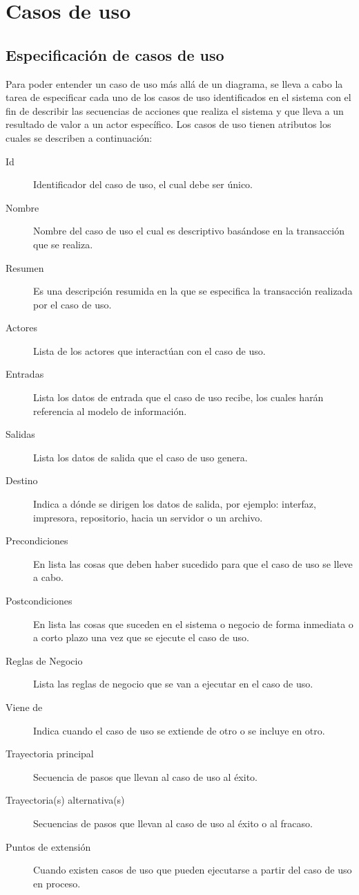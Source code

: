 \chapter{Casos de uso}


\section{Especificación de casos de uso}

Para poder entender un caso de uso más allá de un diagrama, se lleva a cabo la tarea de especificar cada uno de los casos de uso identificados en el sistema con el fin de describir las secuencias de acciones que realiza el sistema y que lleva a un resultado de valor a un actor específico. Los casos de uso tienen atributos los cuales se describen a continuación:

\begin{description}
	\item[Id] Identificador del caso de uso, el cual debe ser único.
	\item[Nombre] Nombre del caso de uso el cual es descriptivo basándose en la transacción que se realiza.
	\item[Resumen] Es una descripción resumida en la que se especifica la transacción realizada por el caso de uso.
	\item[Actores] Lista de los actores que interactúan con el caso de uso.
	\item[Entradas] Lista los datos de entrada que el caso de uso recibe, los cuales harán referencia al modelo de información.
	\item[Salidas] Lista los datos de salida que el caso de uso genera.
	\item[Destino] Indica a dónde se dirigen los datos de salida, por ejemplo: interfaz, impresora, repositorio, hacia un servidor o un archivo.
	\item[Precondiciones] En lista las cosas que deben haber sucedido para que el caso  de uso se lleve a cabo.
	\item[Postcondiciones] En lista las cosas que suceden en el sistema o negocio de forma inmediata o a corto plazo una vez que se ejecute el caso de uso.
	\item[Reglas de Negocio] Lista las reglas de negocio que se van a ejecutar en el caso de uso.
	\item[Viene de] Indica cuando el caso de uso se extiende de otro o se incluye en otro.
	\item[Trayectoria principal] Secuencia de pasos que llevan al caso de uso al éxito.
	\item[Trayectoria(s) alternativa(s)] Secuencias de pasos que llevan al caso de uso al éxito o al fracaso.
	\item[Puntos de extensión] Cuando existen casos de uso que pueden ejecutarse a partir del caso de uso en proceso.
\end{description}

